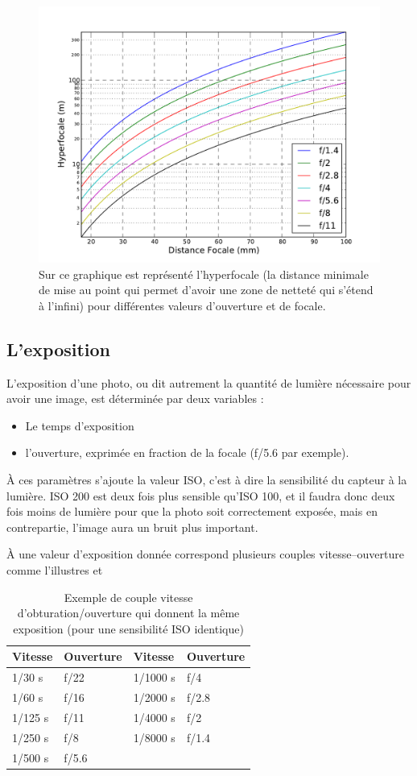 \documentclass[a4paper,twoside]{article}
\begin{document}
\begin{figure}[htb]
\centering
\includegraphics[width=0.5\linewidth]{figure/hyperfocal.pdf}
\caption{Sur ce graphique est représenté l'hyperfocale (la distance minimale de mise au point qui permet d'avoir une zone de netteté qui s'étend à l'infini) pour différentes valeurs d'ouverture et de focale.}
\end{figure}

\subsection{L'exposition}
L'exposition d'une photo, ou dit autrement la quantité de lumière nécessaire pour avoir une image, est déterminée par deux variables : 
\begin{itemize}
\item Le temps d'exposition
\item l'ouverture, exprimée en fraction de la focale (f/5.6 par exemple).
\end{itemize}

À ces paramètres s'ajoute la valeur ISO, c'est à dire la sensibilité du capteur à la lumière. ISO 200 est deux fois plus sensible qu'ISO 100, et il faudra donc deux fois moins de lumière pour que la photo soit correctement exposée, mais en contrepartie, l'image aura un bruit plus important. 

À une valeur d'exposition donnée correspond plusieurs couples vitesse--ouverture comme l'illustres  et 

\begin{table}[htb]
\centering
\begin{tabular}{llll}
Vitesse & Ouverture & Vitesse & Ouverture\\\hline
1/30 s & f/22 & 1/1000 s & f/4\\
1/60 s & f/16 & 1/2000 s & f/2.8\\
1/125 s & f/11 & 1/4000 s & f/2\\
1/250 s & f/8 & 1/8000 s & f/1.4\\
1/500 s & f/5.6 
\end{tabular}
\caption{Exemple de couple vitesse d'obturation/ouverture qui donnent la même exposition (pour une sensibilité ISO identique)}\label{tab:exposition-equivalente}
\end{table}
\end{document}
